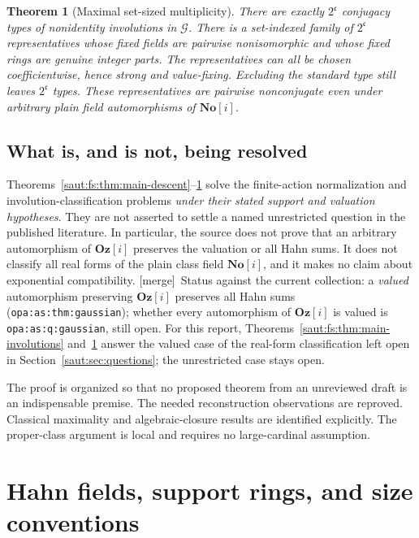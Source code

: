 \documentclass[11pt]{article}
\newtheorem{theorem}{Theorem}[section]
\theoremstyle{definition}
\theoremstyle{remark}
\newcommand{\No}{\mathbf{No}}
\newcommand{\lbl}[1]{\nolinkurl{#1}}%
\newcommand{\Oz}{\mathbf{Oz}}
\newcommand{\cc}{\mathfrak c}
\newcommand{\mergetag}{\textup{[merge]}}
\numberwithin{equation}{section}
\begin{document}
\begin{theorem}[Maximal set-sized multiplicity]\label{saut:fs:thm:main-count}
There are exactly $2^{\cc}$ conjugacy types of nonidentity involutions in
$\mathcal G$. There is a set-indexed family of $2^{\cc}$ representatives whose fixed
fields are pairwise nonisomorphic and whose fixed rings are genuine integer parts.
The representatives can all be chosen coefficientwise, hence strong and
value-fixing. Excluding the standard type still leaves $2^{\cc}$ types. These
representatives are pairwise nonconjugate even under arbitrary plain field
automorphisms of $\No[i]$.
\end{theorem}

\subsection{What is, and is not, being resolved}\label{saut:fs:sec:resolved}

Theorems~\ref{saut:fs:thm:main-descent}--\ref{saut:fs:thm:main-count} solve the
finite-action normalization and involution-classification problems \emph{under
their stated support and valuation hypotheses}. They are not asserted to settle a
named unrestricted question in the published literature. In particular, the source
does not prove that an arbitrary automorphism of $\Oz[i]$ preserves the valuation
or all Hahn sums. It does not classify all real forms of the plain class field
$\No[i]$, and it makes no claim about exponential compatibility.
\mergetag\ Status against the current collection: a \emph{valued} automorphism
preserving $\Oz[i]$ preserves all Hahn sums (\lbl{opa:as:thm:gaussian}); whether
every automorphism of $\Oz[i]$ is valued is \lbl{opa:as:q:gaussian}, still open.
For this report, Theorems~\ref{saut:fs:thm:main-involutions}
and~\ref{saut:fs:thm:main-count} answer the valued case of the real-form
classification left open in Section~\ref{saut:sec:questions}; the unrestricted
case stays open.

The proof is organized so that no proposed theorem from an unreviewed draft is an
indispensable premise. The needed reconstruction observations are reproved.
Classical maximality and algebraic-closure results are identified explicitly. The
proper-class argument is local and requires no large-cardinal assumption.

\section{Hahn fields, support rings, and size conventions}\label{saut:fs:sec:prelim}
\end{document}
